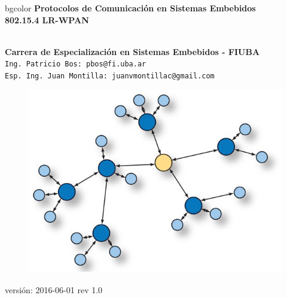 \documentclass[aspectratio=169]{beamer}
\begin{document}
\begingroup
\makeatletter
\setlength{\hoffset}{-.5\beamer@sidebarwidth}
\makeatother
\begin{frame}
\begin{center}
\hfill
    \begin{beamercolorbox}[center,dp=3ex,ht=10.25ex, wd=1\linewidth]{bgcolor}
        \Large\textbf{Protocolos de Comunicación en Sistemas Embebidos}\\
        \huge\textbf{802.15.4 LR-WPAN}
    \end{beamercolorbox}
\hfill\hfill
\\
\vspace{5px}
\textbf{Carrera de Especialización en Sistemas Embebidos - FIUBA}\\
\vspace{10px}
\texttt{Ing. Patricio Bos: pbos@fi.uba.ar}\\
\texttt{Esp. Ing. Juan Montilla: juanvmontillac@gmail.com}\\

\vspace{10px}

\begin{figure}[H]
	\includegraphics[width=.3\textwidth]{./imagenes/red.jpg}
\end{figure}	

\vspace{5px}
\tiny versión: 2016-06-01 rev 1.0 
 	  	
\end{center}
\end{frame}
\endgroup
\end{document}

